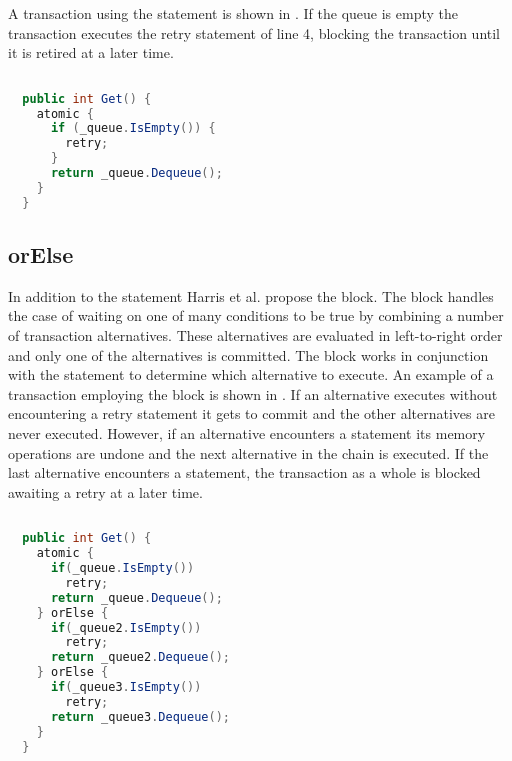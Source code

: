 A transaction using the  statement is shown in . If the queue is empty the transaction executes the retry statement of line 4, blocking the transaction until it is retired at a later time.
\begin{lstlisting}[label=lst:stm_retry,
  caption={Queue with retry},
  language=Java,  
  showspaces=false,
  showtabs=false,
  breaklines=true,
  showstringspaces=false,
  breakatwhitespace=true,
  commentstyle=\color{greencomments},
  keywordstyle=\color{bluekeywords},
  stringstyle=\color{redstrings},
  morekeywords={atomic, retry, orElse}]  % Start your code-block
  
  public int Get() {
    atomic {
      if (_queue.IsEmpty()) {
        retry;
      }
      return _queue.Dequeue();
    }
  }
\end{lstlisting}

\subsection{orElse}
In addition to the  statement Harris et al. propose the  block. The  block handles the case of waiting on one of many conditions to be true by combining a number of transaction alternatives. These alternatives are evaluated in left-to-right order and only one of the alternatives is committed\cite[p. 52]{harris2005composable}. The  block works in conjunction with the  statement to determine which alternative to execute. An example of a transaction employing the  block is shown in . If an alternative executes without encountering a retry statement it gets to commit and the other alternatives are never executed\cite[p. 74]{harris2010transactional}. However, if an alternative encounters a  statement its memory operations are undone and the next alternative in the chain is executed\cite[p. 74]{harris2010transactional}. If the last alternative encounters a  statement, the transaction as a whole is blocked awaiting a retry at a later time\cite[p. 74]{harris2010transactional}.

\begin{lstlisting}[label=lst:stm_orelse,
  caption={Queue with orElse},
  language=Java,  
  showspaces=false,
  showtabs=false,
  breaklines=true,
  showstringspaces=false,
  breakatwhitespace=true,
  commentstyle=\color{greencomments},
  keywordstyle=\color{bluekeywords},
  stringstyle=\color{redstrings},
  morekeywords={atomic, retry, orElse}]  % Start your code-block
  
  public int Get() {
    atomic {
      if(_queue.IsEmpty())
        retry;
      return _queue.Dequeue();
    } orElse {
      if(_queue2.IsEmpty())
        retry;
      return _queue2.Dequeue();
    } orElse {
      if(_queue3.IsEmpty())
        retry;
      return _queue3.Dequeue();
    }
  }
\end{lstlisting}

%
\worksheetend